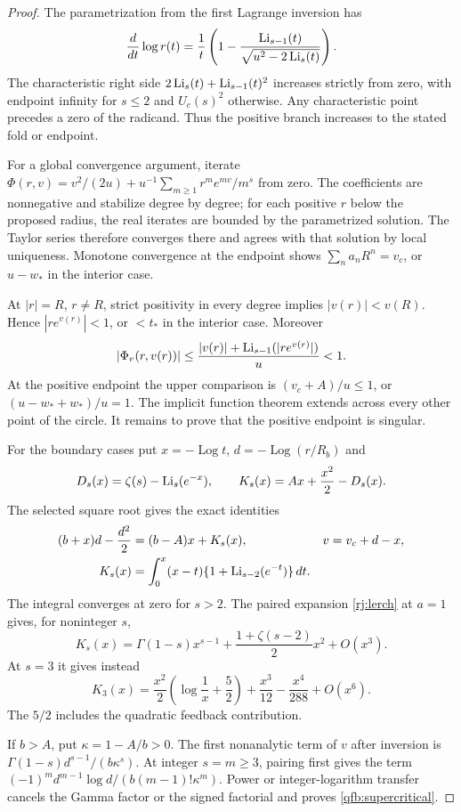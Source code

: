 \begin{proof}
The parametrization from the first Lagrange inversion has
\[
 \frac{d}{dt}\log r(t)=
 \frac1t\left(1-\frac{\operatorname{Li}_{s-1}(t)}
                    {\sqrt{u^2-2\operatorname{Li}_s(t)}}\right).
\]
The characteristic right side $2\operatorname{Li}_s(t)+\operatorname{Li}_{s-1}(t)^2$ increases
strictly from zero, with endpoint infinity for $s\le2$ and $U_c(s)^2$
otherwise. Any characteristic point precedes a zero of the radicand.
Thus the positive branch increases to the stated fold or endpoint.

For a global convergence argument, iterate
$\Phi(r,v)=v^2/(2u)+u^{-1}\sum_{m\ge1}r^me^{mv}/m^s$ from zero.
The coefficients are nonnegative and stabilize degree by degree; for
each positive $r$ below the proposed radius, the real iterates are
bounded by the parametrized solution. The Taylor series therefore
converges there and agrees with that solution by local uniqueness.
Monotone convergence at the endpoint shows $\sum_n a_nR^n=v_c$,
or $u-w_*$ in the interior case.

At $|r|=R$, $r\ne R$, strict positivity in every degree implies
$|v(r)|<v(R)$. Hence $|re^{v(r)}|<1$, or $<t_*$ in the interior
case. Moreover
\[
 |\Phi_v(r,v(r))|
 \le\frac{|v(r)|+\operatorname{Li}_{s-1}(|re^{v(r)}|)}u<1.
\]
At the positive endpoint the upper comparison is
$(v_c+A)/u\le1$, or $(u-w_*+w_*)/u=1$.
The implicit function theorem extends across every other point of the
circle. It remains to prove that the positive endpoint is singular.

For the boundary cases put $x=-\operatorname{Log}t$,
$d=-\operatorname{Log}(r/R_b)$ and
\[
 D_s(x)=\zeta(s)-\operatorname{Li}_s(e^{-x}),\qquad
 K_s(x)=Ax+\frac{x^2}{2}-D_s(x).
\]
The selected square root gives the exact identities
\begin{align}
 (b+x)d-\frac{d^2}{2}&=(b-A)x+K_s(x),&
 v&=v_c+d-x,\label{qfb:normal}\\
 K_s(x)&=\int_0^x(x-t)\{1+\operatorname{Li}_{s-2}(e^{-t})\}\,dt.\notag
\end{align}
The integral converges at zero for $s>2$. The paired expansion
\eqref{rj:lerch} at $a=1$ gives, for noninteger $s$,
\[
 K_s(x)=\Gamma(1-s)x^{s-1}
       +\frac{1+\zeta(s-2)}2x^2+O(x^3).
\]
At $s=3$ it gives instead
\begin{equation}\label{qfb:K3}
 K_3(x)=\frac{x^2}{2}\left(\log\frac1x+\frac52\right)
           +\frac{x^3}{12}-\frac{x^4}{288}+O(x^6).
\end{equation}
The $5/2$ includes the quadratic feedback contribution.

If $b>A$, put $\kappa=1-A/b>0$. The first nonanalytic term
of $v$ after inversion is $\Gamma(1-s)d^{s-1}/(b\kappa^s)$.
At integer $s=m\ge3$, pairing first gives the term
$(-1)^m d^{m-1}\log d/(b(m-1)!\kappa^m)$.
Power or integer-logarithm transfer cancels the Gamma factor or
the signed factorial and proves \eqref{qfb:supercritical}.


\end{proof}
